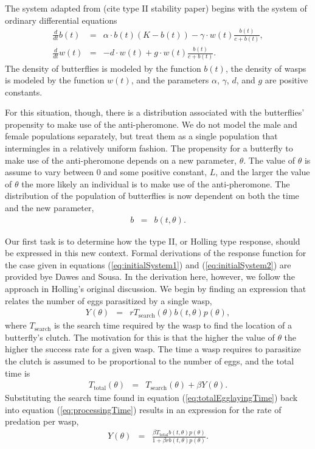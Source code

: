 \documentclass[12pt]{article}
\begin{document}
The system adapted from (cite type II stability paper) begins with the
system of ordinary differential equations
\begin{eqnarray}
  \label{eq:initialSystem1}
  \frac{d}{dt} b(t) & = & \alpha \cdot b(t) (K - b(t)) - \gamma \cdot w(t) \frac{b(t)}{c+b(t)}, \\
  \label{eq:initialSystem2}
  \frac{d}{dt} w(t) & = & -d \cdot w(t) + g \cdot w(t) \frac{b(t)}{c+b(t)}.
\end{eqnarray}
The density of butterflies is modeled by the function $b(t)$, the
density of wasps is modeled by the function $w(t)$, and the parameters
$\alpha$, $\gamma$, $d$, and $g$ are positive constants. 

For this situation, though, there is a distribution associated with
the butterflies' propensity to make use of the anti-pheromone. We do
not model the male and female populations separately, but treat them
as a single population that intermingles in a relatively uniform
fashion. The propensity for a butterfly to make use of the
anti-pheromone depends on a new parameter, $\theta$. The value of
$\theta$ is assume to vary between $0$ and some positive constant,
$L$, and the larger the value of $\theta$ the more likely an
individual is to make use of the anti-pheromone. The distribution of
the population of butterflies is now dependent on both the time and
the new parameter,
\begin{eqnarray}
  b & = & b(t,\theta).
\end{eqnarray}

Our first task is to determine how the type II, or Holling type
response, should be expressed in this new context. Formal derivations
of the response function for the case given in equations
(\ref{eq:initialSystem1}) and (\ref{eq:initialSystem2}) are provided
bye Dawes and Sousa\cite{DAWES201311}.  In the derivation here,
however, we follow the approach in Holling's original
discussion\cite{holling_1959A,holling_1959B}. We begin by finding an
expression that relates the number of eggs parasitized by a single
wasp,
\begin{eqnarray}
  \label{eq:processingTime}
  Y(\theta) & = & r T_{\mathrm{search}}(\theta) b(t,\theta) p(\theta),
\end{eqnarray}
where $T_{\mathrm{search}}$ is the search time required by the wasp to
find the location of a butterfly's clutch. The motivation for this is
that the higher the value of $\theta$ the higher the success rate for
a given wasp.  The time a wasp requires to parasitize the clutch is
assumed to be proportional to the number of eggs, and the total time
is
\begin{eqnarray}
  \label{eq:totalEgglayingTime}
  T_{\mathrm{total}}(\theta) & = & T_{\mathrm{search}}(\theta) + \beta Y(\theta).
\end{eqnarray}
Substituting the search time found in equation
(\ref{eq:totalEgglayingTime}) back into equation
(\ref{eq:processingTime}) results in an expression for the rate of
predation per wasp,
\begin{eqnarray}
  \label{eq:waspPredationRate}
  Y(\theta) & = & \frac{\beta T_{\mathrm{total}} b(t,\theta) p(\theta)}{1 + \beta r b(t,\theta) p(\theta)}.
\end{eqnarray}
\end{document}

